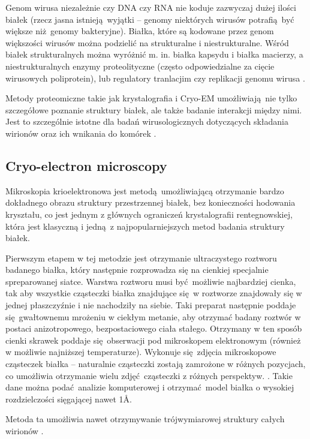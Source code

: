 \documentclass[two column, twoside, a4paper]{article}
\begin{document}
Genom wirusa niezależnie czy DNA czy RNA nie koduje zazwyczaj dużej ilości białek (rzecz jasna istnieją wyjątki -- genomy niektórych wirusów potrafią być większe niż genomy bakteryjne). Białka, które są kodowane przez genom większości wirusów można podzielić na strukturalne i niestrukturalne. Wśród białek strukturalnych można wyróżnić m. in. białka kapsydu i białka macierzy, a niestrukturalnych enzymy proteolityczne (często odpowiedzialne za cięcie wirusowych poliprotein), lub regulatory tranlacjim czy replikacji genomu wirusa \autocite{Piekarowicz2013}.

Metody proteomiczne takie jak krystalografia i  Cryo-EM umożliwiają nie tylko szczegółowe poznanie struktury białek, ale także badanie interakcji między nimi. Jest to szczególnie istotne dla badań wirusologicznych dotyczących składania wirionów oraz ich wnikania do komórek \autocite{Rossmann2000}.

\subsection{Cryo-electron microscopy}

Mikroskopia krioelektronowa jest metodą umożliwiającą otrzymanie bardzo dokładnego obrazu struktury przestrzennej białek, bez konieczności hodowania kryształu, co jest jednym z głównych ograniczeń krystalografii rentegnowskiej, która jest klasyczną i jedną z najpopularniejszych metod badania struktury białek.

Pierwszym etapem w tej metodzie jest otrzymanie ultraczystego roztworu badanego białka, który następnie rozprowadza się na cienkiej specjalnie spreparowanej siatce. Warstwa roztworu musi być możliwie najbardziej cienka, tak aby wszystkie cząsteczki białka znajdujące się w roztworze znajdowały się w jednej płaszczyźnie i nie nachodziły na siebie. Taki preparat następnie poddaje się gwałtownemu mrożeniu w ciekłym metanie, aby otrzymać badany roztwór w postaci anizotropowego, bezpostaciowego ciała stałego. Otrzymany w ten sposób cienki skrawek poddaje się obserwacji pod mikroskopem elektronowym (również w możliwie najniższej temperaturze). Wykonuje się zdjęcia mikroskopowe cząsteczek białka -- naturalnie cząsteczki zostają zamrożone w różnych pozycjach, co umożliwia otrzymanie wielu zdjęć cząsteczki z różnych perspektyw. \autocite{Baldwin1988}. Takie dane można podać analizie komputerowej i otrzymać model białka o wysokiej rozdzielczości sięgającej nawet 1\r{A}.

Metoda ta umożliwia nawet otrzymywanie trójwymiarowej struktury całych wirionów \autocite{Adrian1984}.
\end{document}
